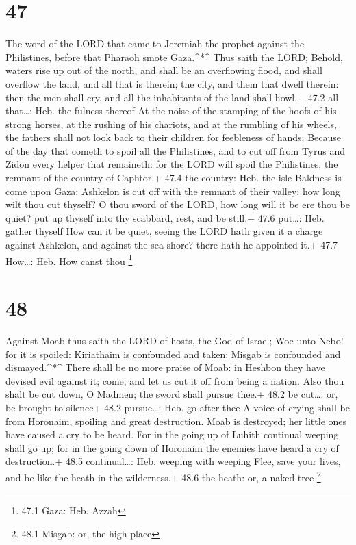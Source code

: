 \hypertarget{section-46}{%
\section{47}\label{section-46}}

 The word of the LORD that came to Jeremiah the prophet
against the Philistines, before that Pharaoh smote Gaza.\^{}*\^{}
 Thus saith the LORD; Behold, waters rise up out of the
north, and shall be an overflowing flood, and shall overflow the land,
and all that is therein; the city, and them that dwell therein: then the
men shall cry, and all the inhabitants of the land shall howl.+ 47.2 all
that\ldots: Heb. the fulness thereof  At the noise of the
stamping of the hoofs of his strong horses, at the rushing of his
chariots, and at the rumbling of his wheels, the fathers shall not look
back to their children for feebleness of hands;  Because of
the day that cometh to spoil all the Philistines, and to cut off from
Tyrus and Zidon every helper that remaineth: for the LORD will spoil the
Philistines, the remnant of the country of Caphtor.+ 47.4 the country:
Heb. the isle  Baldness is come upon Gaza; Ashkelon is cut
off with the remnant of their valley: how long wilt thou cut thyself?
 O thou sword of the LORD, how long will it be ere thou be
quiet? put up thyself into thy scabbard, rest, and be still.+ 47.6
put\ldots: Heb. gather thyself  How can it be quiet, seeing
the LORD hath given it a charge against Ashkelon, and against the sea
shore? there hath he appointed it.+ 47.7 How\ldots: Heb. How canst thou
\footnote{47.1 Gaza: Heb. Azzah}

\hypertarget{section-47}{%
\section{48}\label{section-47}}

 Against Moab thus saith the LORD of hosts, the God of
Israel; Woe unto Nebo! for it is spoiled: Kiriathaim is confounded and
taken: Misgab is confounded and dismayed.\^{}*\^{}  There
shall be no more praise of Moab: in Heshbon they have devised evil
against it; come, and let us cut it off from being a nation. Also thou
shalt be cut down, O Madmen; the sword shall pursue thee.+ 48.2 be
cut\ldots: or, be brought to silence+ 48.2 pursue\ldots: Heb. go after
thee  A voice of crying shall be from Horonaim, spoiling and
great destruction.  Moab is destroyed; her little ones have
caused a cry to be heard.  For in the going up of Luhith
continual weeping shall go up; for in the going down of Horonaim the
enemies have heard a cry of destruction.+ 48.5 continual\ldots: Heb.
weeping with weeping  Flee, save your lives, and be like the
heath in the wilderness.+ 48.6 the heath: or, a naked tree \footnote{48.1
  Misgab: or, the high place}

